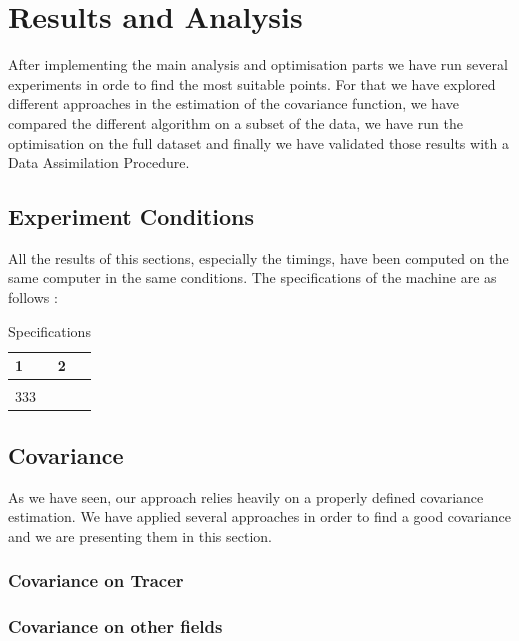 \chapter{Results and Analysis}
After implementing the main analysis and optimisation parts we have run several experiments in orde to find the most suitable points. For that we have explored different approaches in the estimation of the covariance function, we have compared the different algorithm on a subset of the data, we have run the optimisation on the full dataset and finally we have validated those results with a Data Assimilation Procedure. 

\section{Experiment Conditions}

All the results of this sections, especially the timings, have been computed on the same computer in the same conditions. The specifications of the machine are as follows :

\begin{table}[h!]
\centering
\begin{tabular}{l|cc}
  1 & 2 & \\
  \hline
  & & \\
  333 & &
\end{tabular}
\caption{Specifications}
\end{table}
\section{Covariance}

As we have seen, our approach relies heavily on a properly defined covariance estimation. We have applied several approaches in order to find a good covariance and we are presenting them in this section. 

\subsection{Covariance on Tracer}

\subsubsection{}

\subsection{Covariance on other fields}

